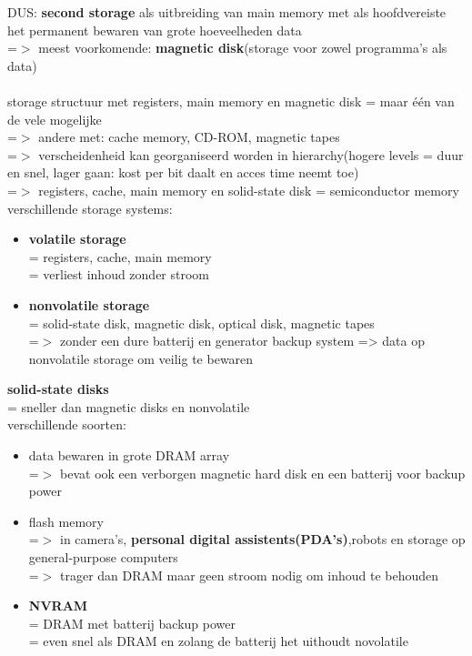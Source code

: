\documentclass{report}
\begin{document}
DUS: \textbf{second storage} als uitbreiding van main memory met als hoofdvereiste het permanent bewaren van grote hoeveelheden data
\\ =$>$ meest voorkomende: \textbf{magnetic disk}(storage voor zowel programma's als data)
\\
\\storage structuur met registers, main memory en magnetic disk = maar \'e\'en van de vele mogelijke
\\=$>$ andere met: cache memory, CD-ROM, magnetic tapes
\\=$>$ verscheidenheid kan georganiseerd worden in hierarchy(hogere levels = duur en snel, lager gaan: kost per bit daalt en acces time neemt toe)
\\=$>$ registers, cache, main memory en solid-state disk = semiconductor memory
\\verschillende storage systems:
\begin{itemize}
\item \textbf{volatile storage}
\\= registers, cache, main memory
\\= verliest inhoud zonder stroom
\item \textbf{nonvolatile storage}
\\= solid-state disk, magnetic disk, optical disk, magnetic tapes
\\=$>$ zonder een dure batterij en generator backup system => data op nonvolatile storage om veilig te bewaren
\end{itemize}
\textbf{solid-state disks}
\\ = sneller dan magnetic disks en nonvolatile
\\ verschillende soorten:
\begin{itemize}
\item data bewaren in grote DRAM array
\\=$>$ bevat ook een verborgen magnetic hard disk en een batterij voor backup power
\item flash memory
\\ =$>$ in camera's, \textbf{personal digital assistents(PDA's)},robots en storage op general-purpose computers
\\=$>$ trager dan DRAM maar geen stroom nodig om inhoud te behouden
\item \textbf{NVRAM}
\\= DRAM met batterij backup power
\\= even snel als DRAM en zolang de batterij het uithoudt novolatile
\end{itemize}
\end{document}
